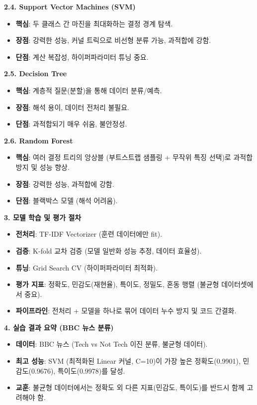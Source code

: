 \documentclass[11pt,a4paper]{article}
\theoremstyle{definition}
\begin{document}
\begin{tcolorbox}[title=\textbf{CSCI89 Lecture 9: 고전적 머신러닝 핵심 요약}, colback=myblue!10, colframe=blue!75!black, boxrule=0.8pt, arc=4pt]
\textbf{2.4. Support Vector Machines (SVM)}
\begin{itemize}
    \item \textbf{핵심}: 두 클래스 간 마진을 최대화하는 결정 경계 탐색.
    \item \textbf{장점}: 강력한 성능, 커널 트릭으로 비선형 분류 가능, 과적합에 강함.
    \item \textbf{단점}: 계산 복잡성, 하이퍼파라미터 튜닝 중요.
\end{itemize}

\textbf{2.5. Decision Tree}
\begin{itemize}
    \item \textbf{핵심}: 계층적 질문(분할)을 통해 데이터 분류/예측.
    \item \textbf{장점}: 해석 용이, 데이터 전처리 불필요.
    \item \textbf{단점}: 과적합되기 매우 쉬움, 불안정성.
\end{itemize}

\textbf{2.6. Random Forest}
\begin{itemize}
    \item \textbf{핵심}: 여러 결정 트리의 앙상블 (부트스트랩 샘플링 + 무작위 특징 선택)로 과적합 방지 및 성능 향상.
    \item \textbf{장점}: 강력한 성능, 과적합에 강함.
    \item \textbf{단점}: 블랙박스 모델 (해석 어려움).
\end{itemize}

\textbf{3. 모델 학습 및 평가 절차}
\begin{itemize}
    \item \textbf{전처리}: TF-IDF Vectorizer (훈련 데이터에만 fit).
    \item \textbf{검증}: K-fold 교차 검증 (모델 일반화 성능 추정, 데이터 효율성).
    \item \textbf{튜닝}: Grid Search CV (하이퍼파라미터 최적화).
    \item \textbf{평가 지표}: 정확도, 민감도(재현율), 특이도, 정밀도, 혼동 행렬 (불균형 데이터셋에서 중요).
    \item \textbf{파이프라인}: 전처리 + 모델을 하나로 묶어 데이터 누수 방지 및 코드 간결화.
\end{itemize}

\textbf{4. 실습 결과 요약 (BBC 뉴스 분류)}
\begin{itemize}
    \item \textbf{데이터}: BBC 뉴스 (Tech vs Not Tech 이진 분류, 불균형 데이터).
    \item \textbf{최고 성능}: SVM (최적화된 Linear 커널, C=10)이 가장 높은 정확도(0.9901), 민감도(0.9676), 특이도(0.9978)를 달성.
    \item \textbf{교훈}: 불균형 데이터에서는 정확도 외 다른 지표(민감도, 특이도)를 반드시 함께 고려해야 함.
\end{itemize}
\end{tcolorbox}
\end{document}
